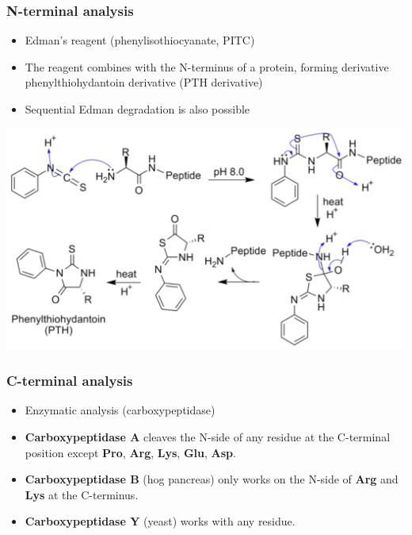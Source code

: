 \documentclass[11pt]{article}
\begin{document}
\subsubsection{N-terminal analysis}
\label{sec:org20d179a}
\begin{itemize}
\item Edman's reagent (phenylisothiocyanate, PITC)
\item The reagent combines with the N-terminus of a protein, forming derivative phenylthiohydantoin derivative (PTH derivative)
\item Sequential Edman degradation is also possible
\end{itemize}
\begin{center}
\includegraphics[width=.9\linewidth]{./images/edman-degradation.png}
\end{center}

\subsubsection{C-terminal analysis}
\label{sec:org32200b7}
\begin{itemize}
\item Enzymatic analysis (carboxypeptidase)
\item \textbf{Carboxypeptidase A} cleaves the N-side of any residue at the C-terminal position except \textbf{Pro}, \textbf{Arg}, \textbf{Lys}, \textbf{Glu}, \textbf{Asp}.
\item \textbf{Carboxypeptidase B} (hog pancreas) only works on the N-side of \textbf{Arg} and \textbf{Lys} at the C-terminus.
\item \textbf{Carboxypeptidase Y} (yeast) works with any residue.
\end{itemize}

\newpage
\end{document}
